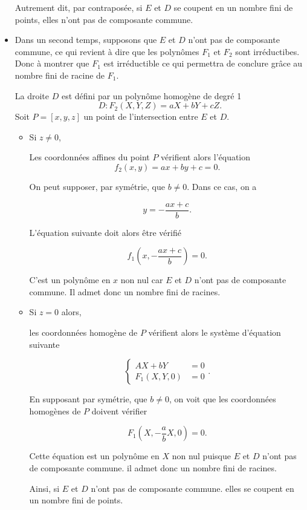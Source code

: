 \begin{demonstration}
\begin{itemize}
    Autrement dit, par contraposée, si $E$ et $D$ se coupent en un nombre fini de points, elles n'ont pas
    de composante commune.

    \item Dans un second temps, supposons que $E$ et $D$ n'ont pas de composante commune, ce
        qui revient à dire que les polynômes $F_1$ et $F_2$ sont irréductibes. Donc à montrer
        que $F_1$ est irréductible ce qui permettra de conclure grâce au nombre fini de racine
        de $F_1$.

    La droite $D$ est défini par un polynôme homogène de degré 1
    \[
    D : F_2(X,Y,Z) = aX + bY + cZ
    .\] 
    Soit $P=[x,y,z]$ un point de l'intersection entre $E$ et $D$.

    \begin{itemize}
        \item Si $z \neq 0$,

            Les coordonnées affines du point $P$ vérifient alors l'équation 
            \[
            f_2(x,y) = ax+by+c = 0
            .\] 

            On peut supposer, par symétrie, que $b \neq 0$. Dans ce cas, on a

            \[
            y = - \frac{ax + c}{b}
            .\] 

            L'équation suivante doit alors être vérifié

            \[
            f_1(x, - \frac{ax+c}{b}) = 0
            .\] 

            C'est un polynôme en $x$ non nul car $E$ et $D$ n'ont pas de composante commune.
            Il admet donc un nombre fini de racines.

        \item Si $z = 0$ alors,

            les coordonnées homogène de $P$ vérifient alors le système d'équation suivante

            \[
                \begin{cases}
                    AX + bY &= 0 \\
                    F_1(X,Y,0) &= 0
                \end{cases}
            .\] 

            En supposant par symétrie, que $b \neq 0$, on voit que les coordonnées
            homogènes de $P$ doivent vérifier

            \[
            F_1(X,- \frac{a}{b}X,0)=0
            .\] 

            Cette équation est un polynôme en $X$ non nul puisque $E$ et $D$ n'ont pas de
            composante commune. il admet donc un nombre fini de racines.

            Ainsi, si $E$ et $D$ n'ont pas de composante commune. elles se coupent en un
            nombre fini de points.
    \end{itemize}
    \end{itemize}
\end{demonstration}

